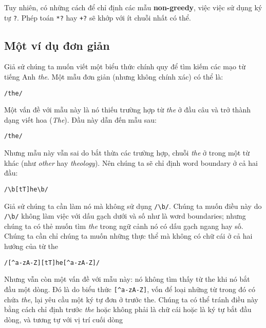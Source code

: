 Tuy nhiên, có những cách để chỉ định các mẫu \textbf{non-greedy}, việc việc sử dụng ký tự \verb|?|. Phép toán \verb|*?| hay \verb|+?| sẽ khớp với ít chuỗi nhất có thể.

\subsection{Một ví dụ đơn giản}

Giả sử chúng ta muốn viết một biểu thức chính quy để tìm kiếm các mạo từ tiếng Anh \textit{the}. Một mẫu đơn giản (nhưng không chính xác) có thể là:

\vspace{0.6em}

\noindent \verb|/the/|

\vspace{0.6em}

Một vấn đề với mẫu này là nó thiếu trường hợp từ \textit{the} ở đầu câu và trở thành dạng viết hoa (\textit{The}). Đầu này dẫn đến mẫu sau:

\vspace{0.6em}

\noindent \verb|/the/|

\vspace{0.6em}

Nhưng mẫu này vẫn sai do bắt thừa các trường hợp, chuỗi \textit{the} ở trong một từ khác (như \textit{other} hay \textit{theology}). Nên chúng ta sẽ chỉ định word boundary ở cả hai đầu:

\vspace{0.6em}

\noindent \verb|/\b[tT]he\b/|

\vspace{0.6em}

Giả sử chúng ta cần làm nó mà không sử dụng \verb|/\b/|. Chúng ta muốn điều này do \verb|/\b/| không làm việc với dấu gạch dưới và số như là wơrd boundaries; nhưng chúng ta có thẻ muốn tìm \textit{the} trong ngữ cảnh nó có dấu gạch ngang hay số. Chúng ta cần chỉ chúng ta muốn những thực thể mà không có chữ cái ở cả hai hướng của từ the

\vspace{0.6em}

\noindent \verb|/[^a-zA-Z][tT]he[^a-zA-Z]/|

\vspace{0.6em}

Nhưng vẫn còn một vấn đề với mẫu này: nó không tìm thấy từ the khi nó bắt đầu một dòng. Đó là do biểu thức \verb|[^a-zA-Z]|, vốn để loại những từ trong đó có chứa \textit{the}, lại yêu cầu một ký tự đơn ở trước the. Chúng ta có thể tránh điều này bằng cách chỉ định trước \textit{the} hoặc không phải là chữ cái hoặc là ký tự bắt đầu dòng, và tương tự với vị trí cuối dòng

